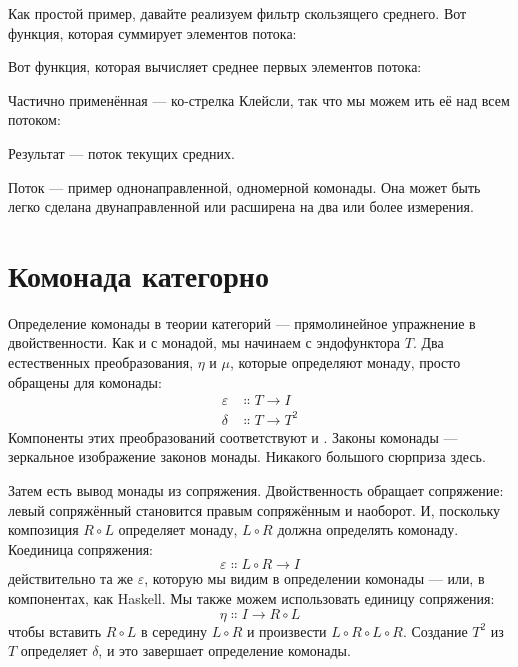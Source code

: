 Как простой пример, давайте реализуем фильтр скользящего среднего. Вот
функция, которая суммирует  элементов потока:

Вот функция, которая вычисляет среднее первых 
элементов потока:

Частично применённая  --- ко-стрелка Клейсли, так что мы можем
ить её над всем потоком:

Результат --- поток текущих средних.

Поток --- пример однонаправленной, одномерной комонады. Она
может быть легко сделана двунаправленной или расширена на два или более измерения.

\section{Комонада категорно}

Определение комонады в теории категорий --- прямолинейное упражнение в
двойственности. Как и с монадой, мы начинаем с эндофунктора $T$.
Два естественных преобразования, $\eta$ и $\mu$, которые определяют монаду, просто
обращены для комонады:
\begin{align*}
  \varepsilon & \Colon T \to I   \\
  \delta      & \Colon T \to T^2
\end{align*}
Компоненты этих преобразований соответствуют 
и . Законы комонады --- зеркальное изображение законов монады.
Никакого большого сюрприза здесь.

Затем есть вывод монады из сопряжения. Двойственность
обращает сопряжение: левый сопряжённый становится правым сопряжённым и
наоборот. И, поскольку композиция $R \circ L$ определяет монаду,
$L \circ R$ должна определять комонаду. Коединица сопряжения:
\[\varepsilon \Colon L \circ R \to I\]
действительно та же $\varepsilon$, которую мы видим в определении комонады ---
или, в компонентах, как  Haskell. Мы также можем использовать
единицу сопряжения:
\[\eta \Colon I \to R \circ L\]
чтобы вставить $R \circ L$ в середину $L \circ R$ и
произвести $L \circ R \circ L \circ R$. Создание $T^2$ из $T$
определяет $\delta$, и это завершает определение комонады.

